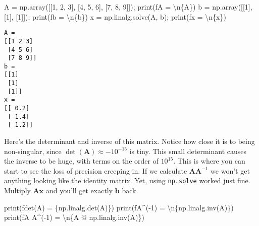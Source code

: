 \documentclass[
  letterpaper,
  DIV=11,
  numbers=noendperiod]{scrreprt}
\newenvironment{Shaded}{\begin{snugshade}}{\end{snugshade}}
\newcommand{\BuiltInTok}[1]{\textcolor[rgb]{0.00,0.23,0.31}{#1}}
\newcommand{\CharTok}[1]{\textcolor[rgb]{0.13,0.47,0.30}{#1}}
\newcommand{\DecValTok}[1]{\textcolor[rgb]{0.68,0.00,0.00}{#1}}
\newcommand{\NormalTok}[1]{\textcolor[rgb]{0.00,0.23,0.31}{#1}}
\newcommand{\OperatorTok}[1]{\textcolor[rgb]{0.37,0.37,0.37}{#1}}
\newcommand{\SpecialCharTok}[1]{\textcolor[rgb]{0.37,0.37,0.37}{#1}}
\newcommand{\SpecialStringTok}[1]{\textcolor[rgb]{0.13,0.47,0.30}{#1}}
\begin{document}
\begin{Shaded}
\begin{Highlighting}[]
\NormalTok{A }\OperatorTok{=}\NormalTok{ np.array([[}\DecValTok{1}\NormalTok{, }\DecValTok{2}\NormalTok{, }\DecValTok{3}\NormalTok{], [}\DecValTok{4}\NormalTok{, }\DecValTok{5}\NormalTok{, }\DecValTok{6}\NormalTok{], [}\DecValTok{7}\NormalTok{, }\DecValTok{8}\NormalTok{, }\DecValTok{9}\NormalTok{]])}\OperatorTok{;} \BuiltInTok{print}\NormalTok{(}\SpecialStringTok{f\textquotesingle{}A = }\CharTok{\textbackslash{}n}\SpecialCharTok{\{}\NormalTok{A}\SpecialCharTok{\}}\SpecialStringTok{\textquotesingle{}}\NormalTok{)}
\NormalTok{b }\OperatorTok{=}\NormalTok{ np.array([[}\DecValTok{1}\NormalTok{], [}\DecValTok{1}\NormalTok{], [}\DecValTok{1}\NormalTok{]])}\OperatorTok{;} \BuiltInTok{print}\NormalTok{(}\SpecialStringTok{f\textquotesingle{}b = }\CharTok{\textbackslash{}n}\SpecialCharTok{\{}\NormalTok{b}\SpecialCharTok{\}}\SpecialStringTok{\textquotesingle{}}\NormalTok{)}
\NormalTok{x }\OperatorTok{=}\NormalTok{ np.linalg.solve(A, b)}\OperatorTok{;} \BuiltInTok{print}\NormalTok{(}\SpecialStringTok{f\textquotesingle{}x = }\CharTok{\textbackslash{}n}\SpecialCharTok{\{}\NormalTok{x}\SpecialCharTok{\}}\SpecialStringTok{\textquotesingle{}}\NormalTok{)}
\end{Highlighting}
\end{Shaded}

\begin{verbatim}
A = 
[[1 2 3]
 [4 5 6]
 [7 8 9]]
b = 
[[1]
 [1]
 [1]]
x = 
[[ 0.2]
 [-1.4]
 [ 1.2]]
\end{verbatim}

Here's the determinant and inverse of this matrix. Notice how close it
is to being non-singular, since \(\det(\mathbf{A}) \approx -10^{-15}\)
is tiny. This small determinant causes the inverse to be huge, with
terms on the order of \(10^{15}\). This is where you can start to see
the loss of precision creeping in. If we calculate
\(\mathbf{A}\mathbf{A}^{-1}\) we won't get anything looking like the
identity matrix. Yet, using \texttt{np.solve} worked just fine. Multiply
\(\mathbf{A}\mathbf{x}\) and you'll get exactly \(\mathbf{b}\) back.

\begin{Shaded}
\begin{Highlighting}[]
\BuiltInTok{print}\NormalTok{(}\SpecialStringTok{f\textquotesingle{}det(A) = }\SpecialCharTok{\{}\NormalTok{np}\SpecialCharTok{.}\NormalTok{linalg}\SpecialCharTok{.}\NormalTok{det(A)}\SpecialCharTok{\}}\SpecialStringTok{\textquotesingle{}}\NormalTok{)}
\BuiltInTok{print}\NormalTok{(}\SpecialStringTok{f\textquotesingle{}A\^{}({-}1) = }\CharTok{\textbackslash{}n}\SpecialCharTok{\{}\NormalTok{np}\SpecialCharTok{.}\NormalTok{linalg}\SpecialCharTok{.}\NormalTok{inv(A)}\SpecialCharTok{\}}\SpecialStringTok{\textquotesingle{}}\NormalTok{)}
\BuiltInTok{print}\NormalTok{(}\SpecialStringTok{f\textquotesingle{}A A\^{}({-}1) = }\CharTok{\textbackslash{}n}\SpecialCharTok{\{}\NormalTok{A }\OperatorTok{@}\NormalTok{ np}\SpecialCharTok{.}\NormalTok{linalg}\SpecialCharTok{.}\NormalTok{inv(A)}\SpecialCharTok{\}}\SpecialStringTok{\textquotesingle{}}\NormalTok{)}
\end{Highlighting}
\end{Shaded}
\end{document}
